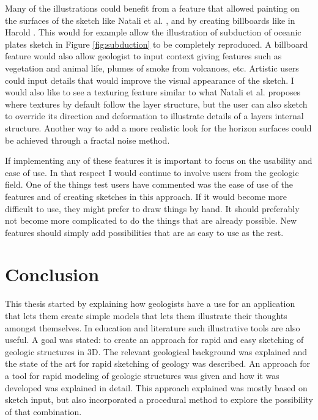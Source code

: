 \documentclass[a4paper,12pt]{report}
\begin{document}
Many of the illustrations could benefit from a feature that allowed painting on the surfaces of the sketch like Natali et al. \cite{natalirapid}, and by creating billboards like in Harold \cite{cohen2000harold}. This would for example allow the illustration of subduction of oceanic plates sketch in Figure \ref{fig:subduction} to be completely reproduced. A billboard feature would also allow geologist to input context giving features such as vegetation and animal life, plumes of smoke from volcanoes, etc. Artistic users could input details that would improve the visual appearance of the sketch. I would also like to see a texturing feature similar to what Natali et al. proposes where textures by default follow the layer structure, but the user can also sketch to override its direction and deformation to illustrate details of a layers internal structure. Another way to add a more realistic look for the horizon surfaces could be achieved through a fractal noise method.

If implementing any of these features it is important to focus on the usability and ease of use. In that respect I would continue to involve users from the geologic field. One of the things test users have commented was the ease of use of the features and of creating sketches in this approach. If it would become more difficult to use, they might prefer to draw things by hand. It should preferably not become more complicated to do the things that are already possible. New features should simply add possibilities that are as easy to use as the rest.

\clearpage
\chapter{Conclusion}
\label{sec:conclusion}
This thesis started by explaining how geologists have a use for an application that lets them create simple models that lets them illustrate their thoughts amongst themselves. In education and literature such illustrative tools are also useful. A goal was stated: to create an approach for rapid and easy sketching of geologic structures in 3D. The relevant geological background was explained and the state of the art for rapid sketching of geology was described. An approach for a tool for rapid modeling of geologic structures was given and how it was developed was explained in detail. This approach explained was mostly based on sketch input, but also incorporated a procedural method to explore the possibility of that combination.
\end{document}
